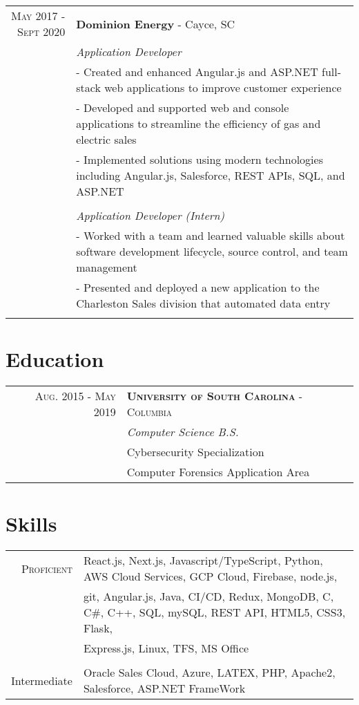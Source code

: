 \documentclass[letterpaper,10pt]{article}
\begin{document}
\begin{tabular}{r|p{14cm}}
 \textsc{May 2017 - Sept 2020} & {\bf Dominion Energy} - Cayce, SC
 \\&\emph{\textcolor{HeaderColor}{Application Developer}}
 \\ &\small{ - Created and enhanced Angular.js and ASP.NET full-stack web applications to improve customer experience} 
 \vspace{.1cm}
 \\ &\small{ - Developed and supported web and console applications to streamline the efficiency of gas and electric sales} 
 \vspace{.1cm}
 \\ & \small{ - Implemented solutions using modern technologies including Angular.js, Salesforce, REST APIs, SQL, and ASP.NET} \\ & 
 \\&\emph{\textcolor{HeaderColor}{Application Developer (Intern)}}\\
 &\small{ - Worked with a team and learned valuable skills about software development lifecycle, source control, and team management } 
 \vspace{.1cm}
 \\& \small{ - Presented and deployed a new application to the Charleston Sales division that automated data entry
 }
 \\\multicolumn{2}{c}{} \\

\end{tabular}

\section{\textcolor{HeaderColor}{Education}}
\begin{tabular}{r|l}	
\textsc{Aug. 2015 - May 2019     }    & \textsc{{\bf University of South Carolina} - Columbia}\\ &\textcolor{HeaderColor}{\emph{Computer Science B.S.}} \\
& \small{Cybersecurity Specialization} \\
& \small{Computer Forensics Application Area } 
\end{tabular}
\section{\textcolor{HeaderColor}{Skills}}
\begin{tabular}{r|l}
\textsc{Proficient     }& React.js, Next.js, Javascript/TypeScript, Python, AWS Cloud Services, GCP Cloud, Firebase, node.js, \\& git, Angular.js, Java, CI/CD, Redux, MongoDB, C, C\#, C++, SQL, mySQL, REST API, HTML5, CSS3, Flask,  \\& Express.js, Linux, TFS, MS Office\\ 
\\
Intermediate &   Oracle Sales Cloud, Azure, LATEX, PHP, Apache2, Salesforce, ASP.NET FrameWork

\end{tabular}
\end{document}
